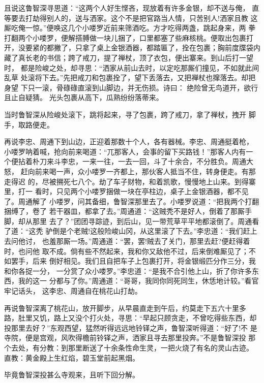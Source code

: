 且说这鲁智深寻思道：“这两个人好生悭吝，现放着有许多金银，却不送与俺，
直等要去打劫得别人的，送与洒家。这个不是把官路当人情，只苦别人!洒家且教
这厮吃俺一惊。”便唤这几个小喽罗近前来筛酒吃。方才吃得两盏，跳起身来，两
拳打翻两个小喽罗，便解搭膊做一块儿捆了，口里都塞了些麻核桃。便取出包裹打
开，没要紧的都撇了，只拿了桌上金银酒器，都踏匾了，拴在包裹；胸前度牒袋内
藏了真长老的书信；跨了戒刀，提了禅杖，顶了衣包，便出寨来。到山后打一望时，
都是险峻之处，却寻思：“洒家从前山去时，以定吃那厮们撞见，不如就此间乱草
处滚将下去。”先把戒刀和包裹拴了，望下丢落去，又把禅杖也撺落去。却把身望
下只一滚，骨碌碌直滚到山脚边，并无伤损。诗曰：
绝险曾无鸟道开，欲行且止自疑猜。
光头包裹从高下，瓜熟纷纷落蒂来。

当时鲁智深从险峻处滚下，跳将起来，寻了包裹，跨了戒刀，拿了禅杖，拽开
脚手，取路便走。

再说李忠、周通下到山边，正迎着那数十个人，各有器械。李忠、周通挺着枪，
小喽罗呐着喊，抢向前来喝道：“兀那客人，会事的留下买路钱！”那客人内有一
个便拈着朴刀来斗李忠，一来一往，一去一回，斗了十余合，不分胜负。周通大怒，
赶向前来喝一声，众小喽罗一齐都上，那伙客人抵当不住，转身便走。有那走得迟
的，尽被搠死七八个。劫了车子财物，和着凯歌，慢慢地上山来。到得寨里，打一
看时，只见两个小喽罗捆做一块在亭柱边，桌子上金银酒器，都不见了。周通解了
小喽罗，问其备细，鲁智深那里去了。小喽罗说道：“把我两个打翻捆缚了，卷了
若干器皿，都拿了去。”周通道：“这贼秃不是好人，倒着了那厮手脚，却从那里
去了？”团团寻踪迹，到后山，见一带荒草平平地都滚倒了。周通看了道：“这秃
驴倒是个老贼!这般险峻山冈，从这里滚了下去。”李忠道：“我们赶上去问他讨，
也羞那厮一场。”周通道：“罢，罢!贼去了关门，那里去赶?便赶得着时，也问他
取不成。倘有些不然起来，我和你又敌他不过，后来倒难厮见了；不如罢手，后来
倒好相见。我们且自把车子上包裹打开，将金银缎匹分作三分，我和你各捉一分，
一分赏了众小喽罗。”李忠道：“是我不合引他上山，折了你许多东西，我的这一
分都与了你。”周通道：“哥哥，我同你同死同生，休恁地计较。”看官牢记话头，
这李忠、周通自在桃花山打劫。

再说鲁智深离了桃花山，放开脚步，从早晨直走到午后，约莫走下五六十里多
路，肚里又饥，路上又没个打火处，寻思：“早起只顾贪走，不曾吃得些东西，却
投那里去好？”东观西望，猛然听得远远地铃铎之声，鲁智深听得道：“好了!不
是寺院，便是宫观，风吹得檐前铃铎之声，洒家且寻去那里投奔。”不是鲁智深投
那个去处，有分教：到那里断送了十余条性命生灵，一把火烧了有名的灵山古迹。
直教：黄金殿上生红焰，碧玉堂前起黑烟。

毕竟鲁智深投甚么寺观来，且听下回分解。